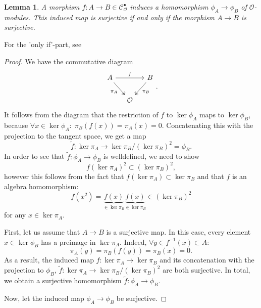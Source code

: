 \documentclass{article}
\theoremstyle{plain}%
\newtheorem{lemma}{Lemma}[section]
\theoremstyle{definition}
\theoremstyle{remark}
\newcommand{\cob}{\mathcal{C}_\mathcal{O}^\bullet}
\begin{document}
\begin{lemma}\label{lem:surjectivity_phi}
    A morphism \(f\colon A \to B \in \cob\) induces a homomorphism \(\phi_A \to \phi_B\) of \(\mathcal{O}\)-modules.
    This induced map is surjective if and only if the morphism \(A \to B\) is surjective.
\end{lemma}
For the 'only if'-part, see \cites[lemma 5.5]{darmon1995fermat}[theorem 8.4]{Matsumura1986}[ch. II, lemma 7.4]{Hartshorne1977}
\begin{proof}
    We have the commutative diagram
    \[
    \begin{tikzcd}[column sep=small]
        A \arrow[rr, "f"] \arrow [dr, "\pi_A", swap, twoheadrightarrow] & & B \arrow [dl, "\pi_B", twoheadrightarrow]\\
        & \mathcal{O} &
    \end{tikzcd}.
    \]
    It follows from the diagram that the restriction of \(f\) to \(\ker \phi_A\) maps to \(\ker \phi_B\),
    because \(\forall x \in \ker \phi_A\colon\; \pi_B(f(x)) = \pi_A(x) = 0\).
    Concatenating this with the projection to the tangent space, we get a map
    \[
        \tilde f\colon \ker \pi_A \to \ker \pi_B/(\ker \pi_B)^2 = \phi_B.
    \]
    In order to see that \(\tilde f\colon \phi_A \to \phi_B\) is welldefined, we need to show 
    \[
        f(\ker \pi_A)^2 \subset (\ker \pi_B)^2,
    \]
    however this follows from the fact that \(f(\ker \pi_A) \subset \ker \pi_B\) and that \(f\) is an algebra
    homomorphism:
    \[
        f(x^2) = \underbrace{f(x)}_{\in \ker \pi_B}\underbrace{f(x)}_{\in \ker \pi_B} \in (\ker \pi_B)^2 
    \]
    for any \(x \in \ker \pi_A\).

    First, let us assume that \(A \to B\) is a surjective map.
    In this case, every element \(x \in \ker \phi_B\) has a preimage in \(\ker \pi_A\). 
    Indeed, \(\forall y \in f^{-1}(x)\subset A\colon\)
    \[
        \pi_A(y) = \pi_B(f(y)) = \pi_B(x) = 0.
    \]
    As a result, the induced map \(f\colon \ker \pi_A \to \ker \pi_B\) and its concatenation with
    the projection to \(\phi_B\), \(\tilde f\colon \ker \pi_A \to \ker \pi_B/(\ker \pi_B)^2\) are both surjective.
    In total, we obtain a surjective homomorphism \(\tilde f\colon \phi_A \to \phi_B\).
    
    Now, let the induced map \(\phi_A \to \phi_B\) be surjective. 


\end{proof}
\end{document}
